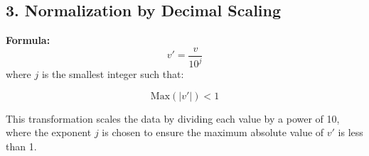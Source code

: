 \documentclass[a4paper,10pt]{article}
\begin{document}
\vspace{0.5cm}

\subsection*{3. Normalization by Decimal Scaling}

\textbf{Formula:}
\[
v' = \frac{v}{10^j}
\]
where \( j \) is the smallest integer such that:

\[
\text{Max}\left(|v'|\right) < 1
\]

This transformation scales the data by dividing each value by a power of 10, where the exponent \( j \) is chosen to ensure the maximum absolute value of \( v' \) is less than 1.

\vspace{0.5cm}
\end{document}

